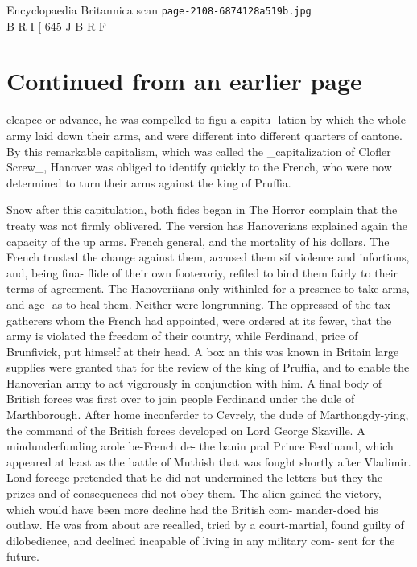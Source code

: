 \documentclass{article}
\begin{document}
\begin{center}
{\Large Encyclopaedia Britannica scan \texttt{page-2108-6874128a519b.jpg}}\\[0.5em]
B R I  [ 645 J B R F
\end{center}
\section*{Continued from an earlier page}
eleapce or advance, he was compelled to figu a capitu- lation by which the whole army laid down their arms, and were different into different quarters of cantone. By this remarkable capitalism, which was called the \_capitalization of Clofler Screw\_, Hanover was obliged to identify quickly to the French, who were now determined to turn their arms against the king of Pruffia.

Snow after this capitulation, both fides began in The Horror complain that the treaty was not firmly oblivered. The version has Hanoverians explained again the capacity of the up arms. French general, and the mortality of his dollars. The French trusted the change against them, accused them sif violence and infortions, and, being fina- flide of their own footeroriy, refiled to bind them fairly to their terms of agreement. The Hanoveriians only withinled for a presence to take arms, and age- as to heal them. Neither were longrunning. The oppressed of the tax-gatherers whom the French had appointed, were ordered at its fewer, that the army is violated the freedom of their country, while Ferdinand, price of Brunfivick, put himself at their head. A box an this was known in Britain large supplies were granted that for the review of the king of Pruffia, and to enable the Hanoverian army to act vigorously in conjunction with him. A final body of British forces was first over to join people Ferdinand under the dule of Marthborough. After home inconferder to Cevrely, the dude of Marthongdy-ying, the command of the British forces developed on Lord George Skaville. A mindunderfunding arole be-French de- the banin pral Prince Ferdinand, which appeared at least as the battle of Muthish that was fought shortly after Vladimir. Lond forcege pretended that he did not undermined the letters but they the prizes and of consequences did not obey them. The alien gained the victory, which would have been more decline had the British com- mander-doed his outlaw. He was from about are recalled, tried by a court-martial, found guilty of dilobedience, and declined incapable of living in any military com- sent for the future.
\end{document}
